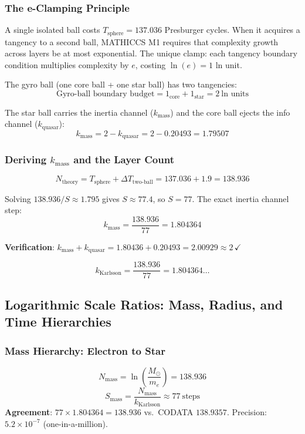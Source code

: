 \documentclass[11pt,a4paper]{article}
\begin{document}
\subsubsection{The e-Clamping Principle}

A single isolated ball costs $T_{\text{sphere}} = 137.036$ Presburger cycles. When
it acquires a tangency to a second ball, MATHICCS M1 requires that complexity
growth across layers be at most exponential. The unique clamp: each tangency
boundary condition multiplies complexity by $e$, costing $\ln(e)=1$ ln unit.

The gyro ball (one core ball + one star ball) has two tangencies:
\[
  \text{Gyro-ball boundary budget} = 1_{\text{core}} + 1_{\text{star}}
    = \boxed{2\ \text{ln units}}
\]

The star ball carries the inertia channel ($k_{\text{mass}}$) and the core ball
ejects the info channel ($k_{\text{quasar}}$):
\[
  k_{\text{mass}} = 2 - k_{\text{quasar}} = 2 - 0.20493 = 1.79507
\]

\subsubsection{Deriving $k_{\text{mass}}$ and the Layer Count}

\[
  N_{\text{theory}} = T_{\text{sphere}} + \Delta T_{\text{two-ball}}
    = 137.036 + 1.9 = 138.936
\]

Solving $138.936/S \approx 1.795$ gives $S \approx 77.4$, so $S = 77$. The exact
inertia channel step:
\[
  k_{\text{mass}} = \frac{138.936}{77} = \mathbf{1.804364}
\]

\textbf{Verification}: $k_{\text{mass}} + k_{\text{quasar}} = 1.80436 + 0.20493
  = 2.00929 \approx 2\,\checkmark$

\[
  \boxed{k_{\text{Karlsson}} = \frac{138.936}{77} = 1.804364\ldots}
\]

\subsection{Logarithmic Scale Ratios: Mass, Radius, and Time Hierarchies}

\subsubsection{Mass Hierarchy: Electron to Star}

\[
  N_{\text{mass}} = \ln\left(\frac{M_\odot}{m_e}\right) = 138.936
\]
\[
  S_{\text{mass}} = \frac{N_{\text{mass}}}{k_{\text{Karlsson}}} \approx 77\ \text{steps}
\]
\textbf{Agreement}: $77\times1.804364 = 138.936$ vs.\ CODATA $138.9357$.
Precision: $5.2\times10^{-7}$ (one-in-a-million).
\end{document}
